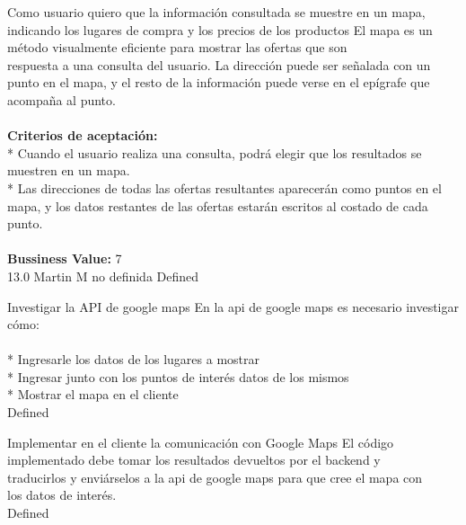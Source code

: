 \vspace{20pt}

	{Como usuario quiero que la información consultada se muestre en un mapa, indicando los lugares de compra y los precios de los productos} %
	{El mapa es un método visualmente eficiente para mostrar las ofertas que son\\
respuesta a una consulta del usuario. La dirección puede ser señalada con un\\
punto en el mapa, y el resto de la información puede verse en el epígrafe que\\
acompaña al punto.\\
  \\
\textbf{Criterios de aceptación:}\\
* Cuando el usuario realiza una consulta, podrá elegir que los resultados se muestren en un mapa.  \\
* Las direcciones de todas las ofertas resultantes aparecerán como puntos en el mapa, y los datos restantes de las ofertas estarán escritos al costado de cada punto. \\
  \\
\textbf{Bussiness Value:} 7\\
} %
	{} %
	{13.0} %
	{Martin M} %
	{no definida} %
	{Defined} %

		{Investigar la API de google maps} %
		{En la api de google maps es necesario investigar cómo:\\
  \\
* Ingresarle los datos de los lugares a mostrar\\
* Ingresar junto con los puntos de interés datos de los mismos\\
* Mostrar el mapa en el cliente\\
} %
		{} %
		{} %
		{} %
		{Defined} %

		{Implementar en el cliente la comunicación con Google Maps} %
		{El código implementado debe tomar los resultados devueltos por el backend y\\
traducirlos y enviárselos a la api de google maps para que cree el mapa con\\
los datos de interés.\\
} %
		{} %
		{} %
		{} %
		{Defined} %

